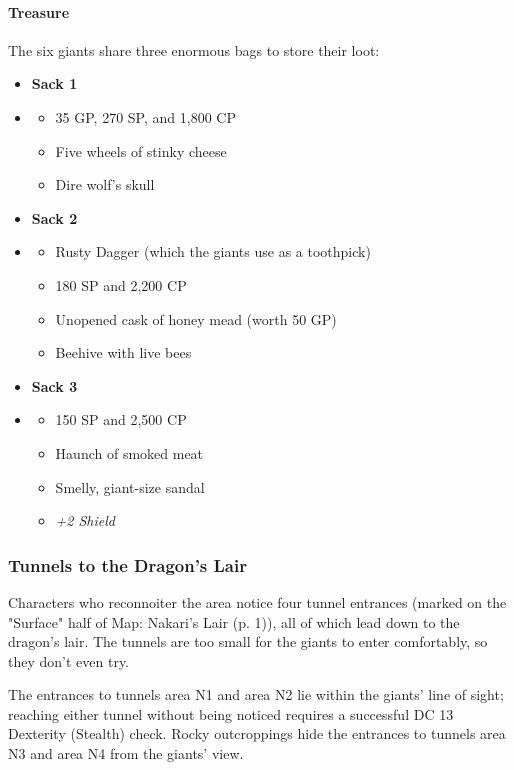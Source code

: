 \documentclass[letterpaper, 11pt, twocolumn]{dndbook}
\begin{document}
\paragraph{Treasure}

The six giants share three enormous bags to store their loot:

\begin{itemize}
\item \textbf{Sack 1}
\item \begin{itemize}
\item 35 GP, 270 SP, and 1,800 CP
\item Five wheels of stinky cheese
\item Dire wolf's skull
\end{itemize}
\item \textbf{Sack 2}
\item \begin{itemize}
\item Rusty Dagger (which the giants use as a toothpick)
\item 180 SP and 2,200 CP
\item Unopened cask of honey mead (worth 50 GP)
\item Beehive with live bees
\end{itemize}
\item \textbf{Sack 3}
\item \begin{itemize}
\item 150 SP and 2,500 CP
\item Haunch of smoked meat
\item Smelly, giant-size sandal
\item \textit{+2 Shield}
\end{itemize}
\end{itemize}

\subsubsection{Tunnels to the Dragon's Lair}

Characters who reconnoiter the area notice four tunnel entrances (marked on the "Surface" half of Map: Nakari's Lair (p. 1)), all of which lead down to the dragon's lair. The tunnels are too small for the giants to enter comfortably, so they don't even try.

The entrances to tunnels area N1 and area N2 lie within the giants' line of sight; reaching either tunnel without being noticed requires a successful DC 13 Dexterity (Stealth) check. Rocky outcroppings hide the entrances to tunnels area N3 and area N4 from the giants' view.
\end{document}
